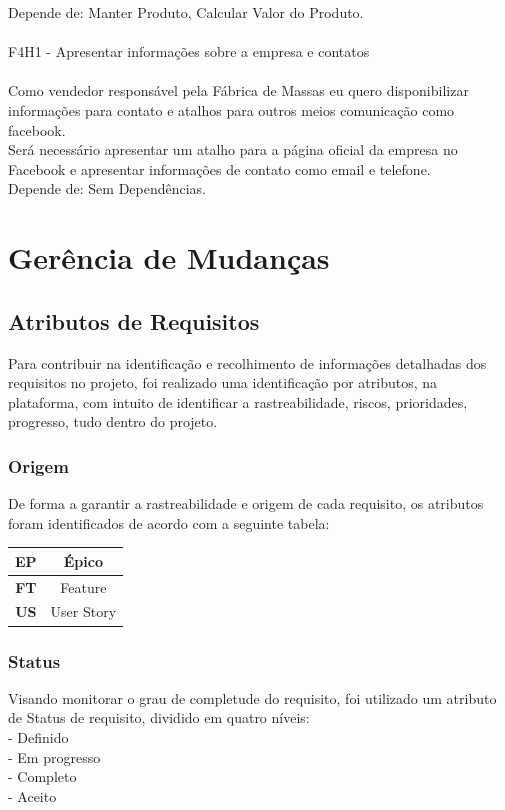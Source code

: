 \tab Depende de: Manter Produto, Calcular Valor do Produto.\\
\\
\tab F4H1 - Apresentar informações sobre a empresa e contatos\\
\\
\tab Como vendedor responsável pela Fábrica de Massas eu quero disponibilizar informações para contato e atalhos para outros meios comunicação como facebook.\\
\tab Será necessário apresentar um atalho para a página oficial da empresa no Facebook e apresentar informações de contato como email e telefone.\\
\tab Depende de: Sem Dependências.\\

\section{Gerência de Mudanças}

\subsection {Atributos de Requisitos}

Para  contribuir na identificação e recolhimento de informações detalhadas dos requisitos no projeto, foi realizado uma identificação por atributos, na plataforma, com intuito de identificar a rastreabilidade, riscos, prioridades, progresso, tudo dentro do projeto. \\

\subsubsection{Origem}
De forma a garantir a rastreabilidade e origem de cada requisito, os atributos foram identificados de acordo com a seguinte tabela:\\

\begin{tabular}{|c|c|}
  \hline
  \textbf{EP} & Épico \\ \hline
  \textbf{FT} & Feature \\ \hline
  \textbf{US} & User Story \\ \hline
\end{tabular}

\subsubsection{Status}
Visando monitorar o grau de completude do requisito, foi utilizado um atributo de Status de requisito, dividido em quatro níveis: \\
\tab - Definido\\
\tab - Em progresso\\
\tab - Completo\\
\tab - Aceito\\

